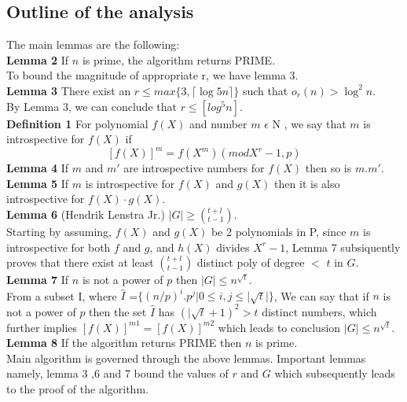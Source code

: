 \documentclass[10pt]{article}
\begin{document}
\subsection*{Outline of the analysis}
The main lemmas are the following:\\
\textbf{Lemma 2} If $n$ is prime, the algorithm returns PRIME.\\
To bound the magnitude of appropriate r, we have lemma 3.\\
\textbf{Lemma 3} There exist an $r \leq max\{3,\lceil \log5 n \rceil\}$ such that $o_r(n) > \log^2n$.\\
By Lemma 3, we can conclude that $r\leq[log ^{5}n]$.\\
\textbf{Definition 1} For polynomial $f(X)$ and number $m$ $\epsilon$ N , we say that $m$ is introspective for $f(X)$ if 
\[[f(X)]^m = f(X^m )(mod X^{r}-1, p)\]
\textbf{Lemma 4} If $m$ and $m'$ are introspective numbers for $f(X)$ then so is $m.m'$.\\
\textbf{Lemma 5} If $m$ is introspective for $f(X)$ and $g(X)$ then it is also introspective for $f (X) · g(X)$.\\
\textbf{Lemma 6} (Hendrik Lenstra Jr.) $ |G| \geq (^{t+l} _{t-1})$.\\
Starting by assuming, $f(X)$ and $g(X)$ be 2 polynomials in P, since $m$ is introspective for both $f$ and $g$, and $h(X)$ divides $X^{r} -1$, Lemma 7 subsiquently proves that there exist at least $(^{t+l} _{t-1})$ distinct poly of degree $<$ $t$ in $G$.\\
\textbf{Lemma 7} If $n$ is not a power of $p$ then $|G|\leq n^{\sqrt{t}}$.\\
From a subset I, where $\hat{I}$ =$ \{(n/p)^{i}.p^{j}|0\leq i,j \leq |\sqrt{t}|\}$, We can say that if $n$ is not a power of $p$ then the set $\hat{I}$ has $(|\sqrt{t} + 1)^2 >t$ distinct numbers, which further implies $[f(X)]^{m1} = [f(X)]^{m2}$ which leads to conclusion $|G|\leq n^{\sqrt{t}}$.\\
\textbf{Lemma 8} If the algorithm returns PRIME then $n$ is prime.\\

Main algorithm is governed through the above lemmas. Important lemmas namely, lemma 3 ,6 and 7 bound the values of $r$ and $G$ which subsequently leads to the proof of the algorithm.
\end{document}
